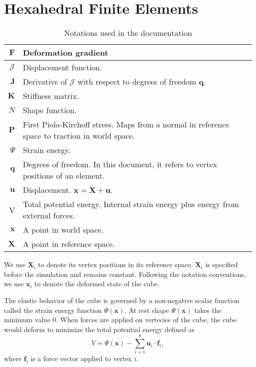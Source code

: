 \documentclass{article}
\newcommand{\mcJ}{\mathcal{J}}
\newcommand{\mbF}{\mathbf{F}}
\newcommand{\mbJ}{\mathbf{J}}
\newcommand{\mbK}{\mathbf{K}}
\newcommand{\mbP}{\mathbf{P}}
\newcommand{\mbX}{\mathbf{X}}
\newcommand{\mbx}{\mathbf{x}}
\newcommand{\mbf}{\mathbf{f}}
\newcommand{\mbq}{\mathbf{q}}
\newcommand{\mbu}{\mathbf{u}}
\begin{document}
	\section{Hexahedral Finite Elements}
	\begin{table}
		\centering
		\begin{tabular}{| r | p{8cm} |}
			\hline
			$\mbF$ & Deformation gradient\\
			\hline
			$\mcJ$ & Displacement function.\\
			\hline
			$\mbJ$ & Derivative of $\mcJ$ with respect to degrees of freedom $\mbq$.\\
			\hline
			$\mbK$ & Stiffness matrix.\\
			\hline
			$N$ & Shape function. \\
			\hline
			$\mbP$ & First Piola-Kirchoff stress. Maps from a normal in reference space to traction in world space.\\
			\hline
			$\Psi$ & Strain energy.\\
			\hline
			$\mbq$ & Degrees of freedom. In this document, it refers to vertex positions of an element.\\
			\hline
			$\mbu$ & Displacement. $\mbx = \mbX+\mbu$.\\
			\hline
			V & Total potential energy. Internal strain energy plus energy from external forces.\\
			\hline
			$\mbx$ & A point in world space.\\
			\hline
			$\mbX$ & A point in reference space.\\
			\hline
		\end{tabular}
		\caption{Notations used in the documentation}
		\label{table:symbols}
	\end{table}
	
We use $\mbX_i$ to denote its vertex positions in its reference space.
	$\mbX_i$ is specified before the simulation and remains constant.
	Following the notation conventions, we use $\mbx_i$ to denote the deformed state
	of the cube.
	
	The elastic behavior of the cube is governed by a non-negative scalar function called the strain energy function $\Psi(\mbx)$.
	At rest shape $\Psi(\mbx)$ takes the minimum value $0$. When forces are applied on vertecies of the cube, the
	cube would deform to minimize the total potential energy defined as
	\begin{equation}
	V=\Psi(\mbx) - \sum_{i=1}^8\mbu_i\cdot \mbf_i,
	\label{eq:pot}
	\end{equation}
	where $\mbf_i$ is a force vector applied to vertex $i$.
\end{document}
